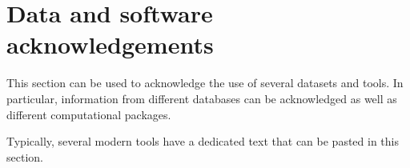 \chapter*{Data and software acknowledgements}\label{data_software_ack}
\pagestyle{NoNumberChapStyle}

This section can be used to acknowledge the use of several datasets and tools. In particular, information from different databases can be acknowledged as well as different computational packages.

Typically, several modern tools have a dedicated text that can be pasted in this section.
